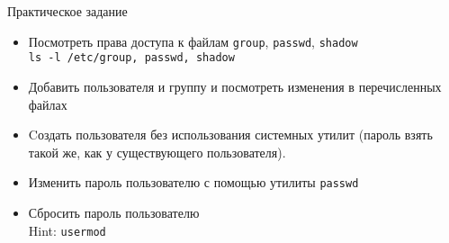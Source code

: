 \begin{frame}{Практическое задание}
    \begin{itemize}
		\item Посмотреть права доступа к файлам {\tt group}, {\tt passwd}, {\tt shadow}\\
			{\tt ls -l /etc/{group, passwd, shadow}}
		\item Добавить пользователя и группу и посмотреть изменения в перечисленных файлах
		\item Cоздать пользователя без использования системных утилит (пароль взять такой же, как у существующего пользователя).
    \end{itemize}
	\pause
	 \begin{itemize}
		\item Изменить пароль пользователю с помощью утилиты {\tt passwd}%
		\item Сбросить пароль пользователю\\
			Hint: {\tt usermod}
    \end{itemize}
\end{frame}


